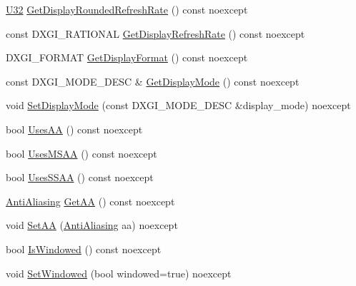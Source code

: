 \begin{DoxyCompactItemize}
\mbox{\hyperlink{namespacemage_aa5d6eaabaac3cdd01873d6a3d27e90f3}{U32}} \mbox{\hyperlink{classmage_1_1rendering_1_1_display_configuration_a6650e981bf82c85d5339afbc37cee64a}{Get\+Display\+Rounded\+Refresh\+Rate}} () const noexcept
\item 
const D\+X\+G\+I\+\_\+\+R\+A\+T\+I\+O\+N\+AL \mbox{\hyperlink{classmage_1_1rendering_1_1_display_configuration_ae100fc84cd1900e302fb784f429a06b7}{Get\+Display\+Refresh\+Rate}} () const noexcept
\item 
D\+X\+G\+I\+\_\+\+F\+O\+R\+M\+AT \mbox{\hyperlink{classmage_1_1rendering_1_1_display_configuration_a66c6757aa4c17227ab0e7022228f982a}{Get\+Display\+Format}} () const noexcept
\item 
const D\+X\+G\+I\+\_\+\+M\+O\+D\+E\+\_\+\+D\+E\+SC \& \mbox{\hyperlink{classmage_1_1rendering_1_1_display_configuration_af3cd8d29b8f6d6bc0fa1579260badf99}{Get\+Display\+Mode}} () const noexcept
\item 
void \mbox{\hyperlink{classmage_1_1rendering_1_1_display_configuration_a7cc6b9dcf3932a62bfd1416fc7b397ea}{Set\+Display\+Mode}} (const D\+X\+G\+I\+\_\+\+M\+O\+D\+E\+\_\+\+D\+E\+SC \&display\+\_\+mode) noexcept
\item 
bool \mbox{\hyperlink{classmage_1_1rendering_1_1_display_configuration_abbcb68e66c4a659cb169819a4f1d0d5d}{Uses\+AA}} () const noexcept
\item 
bool \mbox{\hyperlink{classmage_1_1rendering_1_1_display_configuration_a1cd8c25ade06ad47945ca0046e350749}{Uses\+M\+S\+AA}} () const noexcept
\item 
bool \mbox{\hyperlink{classmage_1_1rendering_1_1_display_configuration_ad233d7838a302fa0ce73cf06b1660404}{Uses\+S\+S\+AA}} () const noexcept
\item 
\mbox{\hyperlink{namespacemage_1_1rendering_ac3f75e49e92b42f2f5fb55c450d8899c}{Anti\+Aliasing}} \mbox{\hyperlink{classmage_1_1rendering_1_1_display_configuration_a243b2a170b97a9583f76a8f16aee5ba6}{Get\+AA}} () const noexcept
\item 
void \mbox{\hyperlink{classmage_1_1rendering_1_1_display_configuration_a8cb3173220d7405353fa4d1726e7063d}{Set\+AA}} (\mbox{\hyperlink{namespacemage_1_1rendering_ac3f75e49e92b42f2f5fb55c450d8899c}{Anti\+Aliasing}} aa) noexcept
\item 
bool \mbox{\hyperlink{classmage_1_1rendering_1_1_display_configuration_acbe793e625311707e234fcd0977978d5}{Is\+Windowed}} () const noexcept
\item 
void \mbox{\hyperlink{classmage_1_1rendering_1_1_display_configuration_a78d0902979bd5a0eff7fef0aa7976a7f}{Set\+Windowed}} (bool windowed=true) noexcept

\end{DoxyCompactItemize}
